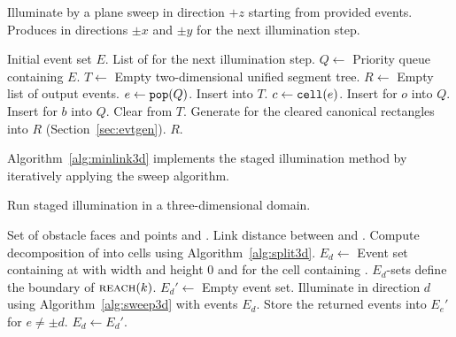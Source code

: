 \documentclass[english,gradu]{tktltiki2018}
\begin{document}
\begin{algorithm}
\caption{Illuminate by a plane sweep in direction $+z$ starting from provided events.
	Produces \addEs in directions $\pm x$ and $\pm y$ for the next illumination step.}\label{alg:sweep3d}
\begin{algorithmic}
\Require Initial event set $E$.
\Output List of \addEs for the next illumination step.
\State $Q\gets$ Priority queue containing $E$.
\State $T\gets$ Empty two-dimensional unified segment tree.
\State $R\gets$ Empty list of output events.
	\State $e\gets\texttt{pop}(Q)$.
		\State Insert  into $T$.
			\State $c\gets\mathtt{cell}(e)$.
				\State Insert \obsE for $o$ into $Q$.
			\EndFor
				\State Insert \cellE for $b$ into $Q$.
			\EndFor
		\EndIf
		\State Clear  from $T$.
		\State Generate \addEs for the cleared canonical rectangles into $R$ (Section~\ref{sec:evtgen}).
	\EndIf
\EndWhile
\State \Return $R$.
\end{algorithmic}
\end{algorithm}

Algorithm~\ref{alg:minlink3d} implements the staged illumination method by iteratively applying the sweep algorithm.

\begin{algorithm}
\caption{Run staged illumination in a three-dimensional domain.}\label{alg:minlink3d}
\begin{algorithmic}
\Require Set of obstacle faces and points \spt and \ept.
\Output Link distance between \spt and \ept.
\State Compute decomposition of \fspace into cells using Algorithm~\ref{alg:split3d}.
	\State $E_d\gets$ Event set containing \addE at \spt with width and height 0 and \cellE for the cell containing \spt.
\EndFor
{}\Comment $E_d$-sets define the boundary of $\textsc{reach}(k)$.
		\State $E_d'\gets$ Empty event set.
	\EndFor
		\State Illuminate in direction $d$ using Algorithm~\ref{alg:sweep3d} with events $E_d$.
		\State Store the returned events into $E_e'$ for $e\neq\pm d$.
	\EndFor
		\State $E_d\gets E_d'$.
	\EndFor
\EndWhile
\end{algorithmic}
\end{algorithm}
\end{document}
